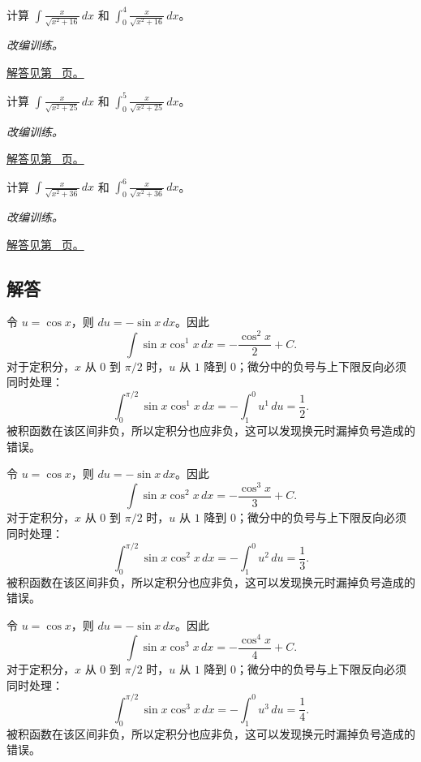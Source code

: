 \documentclass[UTF8,12pt,a4paper,fontset=fandol]{ctexart}
\begin{document}
\begin{example}[双曲型根式的直接代换]\label{ex:c14q22}
计算 $\displaystyle\int\frac{x}{\sqrt{x^2+16}}\,dx$ 和 $\displaystyle\int_0^{4}\frac{x}{\sqrt{x^2+16}}\,dx$。
\par\textit{改编训练。}\par\hyperref[ans:c14q22]{解答见第~\pageref{ans:c14q22} 页。}
\end{example}
\begin{example}[双曲型根式的直接代换]\label{ex:c14q23}
计算 $\displaystyle\int\frac{x}{\sqrt{x^2+25}}\,dx$ 和 $\displaystyle\int_0^{5}\frac{x}{\sqrt{x^2+25}}\,dx$。
\par\textit{改编训练。}\par\hyperref[ans:c14q23]{解答见第~\pageref{ans:c14q23} 页。}
\end{example}
\begin{example}[双曲型根式的直接代换]\label{ex:c14q24}
计算 $\displaystyle\int\frac{x}{\sqrt{x^2+36}}\,dx$ 和 $\displaystyle\int_0^{6}\frac{x}{\sqrt{x^2+36}}\,dx$。
\par\textit{改编训练。}\par\hyperref[ans:c14q24]{解答见第~\pageref{ans:c14q24} 页。}
\end{example}
\subsection{解答}
\begin{solve}\label{ans:c14q1}
令 $u=\cos x$，则 $du=-\sin x\,dx$。因此
\[
\int\sin x\cos^{1}x\,dx=-\frac{\cos^{2}x}{2}+C.
\]
对于定积分，$x$ 从 $0$ 到 $\pi/2$ 时，$u$ 从 $1$ 降到 $0$；微分中的负号与上下限反向必须同时处理：
\[
\int_0^{\pi/2}\sin x\cos^{1}x\,dx=-\int_1^0u^{1}\,du=\frac{1}{2}.
\]
被积函数在该区间非负，所以定积分也应非负，这可以发现换元时漏掉负号造成的错误。
\end{solve}

\begin{solve}\label{ans:c14q2}
令 $u=\cos x$，则 $du=-\sin x\,dx$。因此
\[
\int\sin x\cos^{2}x\,dx=-\frac{\cos^{3}x}{3}+C.
\]
对于定积分，$x$ 从 $0$ 到 $\pi/2$ 时，$u$ 从 $1$ 降到 $0$；微分中的负号与上下限反向必须同时处理：
\[
\int_0^{\pi/2}\sin x\cos^{2}x\,dx=-\int_1^0u^{2}\,du=\frac{1}{3}.
\]
被积函数在该区间非负，所以定积分也应非负，这可以发现换元时漏掉负号造成的错误。
\end{solve}

\begin{solve}\label{ans:c14q3}
令 $u=\cos x$，则 $du=-\sin x\,dx$。因此
\[
\int\sin x\cos^{3}x\,dx=-\frac{\cos^{4}x}{4}+C.
\]
对于定积分，$x$ 从 $0$ 到 $\pi/2$ 时，$u$ 从 $1$ 降到 $0$；微分中的负号与上下限反向必须同时处理：
\[
\int_0^{\pi/2}\sin x\cos^{3}x\,dx=-\int_1^0u^{3}\,du=\frac{1}{4}.
\]
被积函数在该区间非负，所以定积分也应非负，这可以发现换元时漏掉负号造成的错误。
\end{solve}
\end{document}
